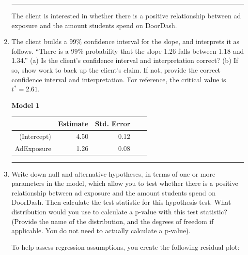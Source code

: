 \documentclass[11pt]{article}
\begin{document}
\begin{enumerate}
\rule{\textwidth}{1pt}

The client is interested in whether there is a positive relationship between ad exposure and the amount students spend on DoorDash.

\item The client builds a 99\% confidence interval for the slope, and interprets it as follows. ``There is a 99\% probability that the slope 1.26 falls between 1.18 and 1.34.'' (a) Is the client's confidence interval and interpretation correct? (b) If so, show work to back up the client's claim. If not, provide the correct confidence interval and interpretation. For reference, the critical value is $t^* = 2.61$.


\pagebreak


\textbf{Model 1} 

\begin{center}
\begin{tabular}{rrrrr}
  \hline
             & Estimate & Std. Error \\
  \hline
(Intercept)    & 4.50 & 0.12    \\
 AdExposure    & 1.26 & 0.08 \\
  \hline
\end{tabular}
\end{center}

\rule{\textwidth}{1pt}

\item Write down null and alternative hypotheses, in terms of one or more parameters in the model, which allow you to test whether there is a positive relationship between ad exposure and the amount students spend on DoorDash. Then calculate the test statistic for this hypothesis test. What distribution would you use to calculate a p-value with this test statistic? (Provide the name of the distribution, and the degrees of freedom if applicable. You do not need to actually calculate a p-value).

\pagebreak



To help assess regression assumptions, you create the following residual plot:


\end{enumerate}
\end{document}
